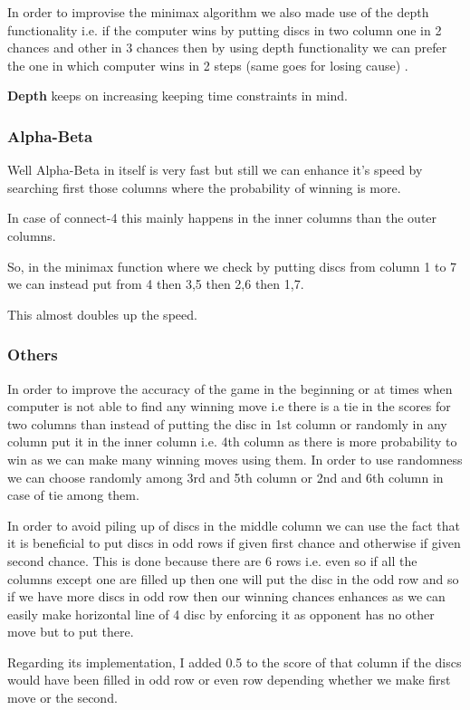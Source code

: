 \documentclass[11pt]{article}
\begin{document}
In order to improvise the minimax algorithm we also made use of the depth functionality i.e. if  the computer wins by putting discs in two column one in 2 chances and other in 3 chances then by using depth functionality we can prefer the one in which computer wins in 2 steps (same goes for losing cause) .       

\textbf{Depth }keeps on increasing keeping time constraints in mind.



\subsubsection{Alpha-Beta}
Well Alpha-Beta in itself is very fast but still we can enhance it’s speed by searching first those columns where the probability of winning is more.

In case of connect-4 this mainly happens in the inner columns than the outer columns.

So,  in the minimax function where we check by putting discs from column 1 to 7 we can instead put from 4 then 3,5 then 2,6 then 1,7.

This almost doubles up the speed.

\subsubsection{Others}
In order to improve the accuracy of the game in the beginning or at times when computer is not able to find any winning move i.e there is a tie in the scores for two columns than instead of putting the disc in 1st column or randomly in any column put it in the inner column i.e. 4th column as there is more probability to win as we can make many winning moves using them. In order to use randomness we can choose randomly among 3rd and 5th column or 2nd and 6th column in case of tie among them.

In order to avoid piling up of discs in the middle column we can use the fact that it is beneficial to put discs in odd rows if given first chance and otherwise if given second chance. This is done because there are 6 rows i.e. even so if all the columns except one are filled up then one will put the disc in the odd row and so if we have more discs in odd row then our winning chances enhances as we can easily make horizontal line of 4 disc by enforcing it as opponent has no other move but to put there.

Regarding its implementation, I added 0.5 to the score of that column if the discs would have been filled in odd row or even row depending whether we make first move or the second.
\end{document}
